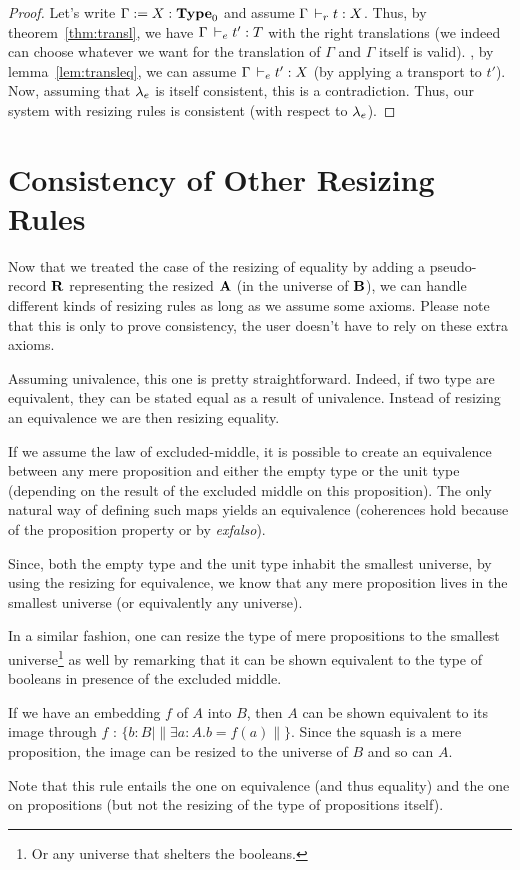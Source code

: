 \documentclass[a4paper,english]{lipics-utf8x}
\begin{document}
  \begin{proof}
    Let's write $\Gamma := X : \operatorname{\mathbf{Type}}_0$ and assume $\Gamma \,\vdash_r t : X$.
    Thus, by theorem~\ref{thm:transl}, we have $\Gamma \,\vdash_e t' : T$ with
    the right translations (we indeed can choose whatever we want for the
    translation of $\Gamma$ and $\Gamma$ itself is valid).
    \Wlog, by lemma~\ref{lem:transleq}, we can assume
    $\Gamma \,\vdash_e t' : X$ (by applying a transport to $t'$).
    Now, assuming that $\lambda_e$ is itself consistent, this is a contradiction.
    Thus, our system with resizing rules is consistent (with respect to $\lambda_e$).
  \end{proof}

  \section{Consistency of Other Resizing Rules}

  Now that we treated the case of the resizing of equality by adding a
  pseudo-record $\operatorname{\mathbf{R}}$ representing the resized $\operatorname{\mathbf{A}}$ (\ie in the universe of
  $\operatorname{\mathbf{B}}$), we can handle different kinds of resizing rules as long as we assume
  some axioms.
  Please note that this is only to prove consistency, the user doesn't have to
  rely on these extra axioms.


  Assuming univalence, this one is pretty straightforward.
  Indeed, if two type are equivalent,
  they can be stated equal as a result of univalence. Instead of resizing an
  equivalence we are then resizing equality.


  If we assume the law of excluded-middle, it is possible to create an
  equivalence between any mere proposition and either the empty type or the
  unit type (depending on the result of the excluded middle on this
  proposition). The only natural way of defining such maps yields an equivalence
  (coherences hold because of the proposition property or by \emph{exfalso}).

  Since, both the empty type and the unit type inhabit the smallest universe,
  by using the resizing for equivalence, we know that any mere proposition lives
  in the smallest universe (or equivalently any universe).

  In a similar fashion, one can resize the type of mere propositions to the
  smallest universe\footnote{Or any universe that shelters the booleans.} as
  well by remarking that it can be shown equivalent to
  the type of booleans in presence of the excluded middle.


  If we have an embedding $f$ of $A$ into $B$, then $A$ can be shown equivalent
  to its image through $f$ : $\{ b : B \mid \| \exists a:A. b = f(a) \| \}$.
  Since the squash is a mere proposition, the image can be resized to the
  universe of $B$ and so can $A$.

  Note that this rule entails the one on equivalence (and thus equality) and
  the one on propositions (but not the resizing of the type of propositions
  itself).
\end{document}
